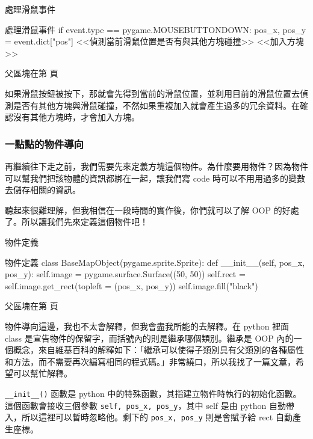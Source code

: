\documentclass[12pt, a4paper]{siweb}
\begin{document}
\begin{siweb}{處理滑鼠事件}
\begin{mylisting}{處理滑鼠事件}
if event.type == pygame.MOUSEBUTTONDOWN:
	pos_x, pos_y = event.dict["pos"]
	<<偵測當前滑鼠位置是否有與其他方塊碰撞>>
	<<加入方塊>>
\end{mylisting}
\label{處理滑鼠事件_0}\label{偵測當前滑鼠位置是否有與其他方塊碰撞_father}\label{加入方塊_father}
父區塊在第\pageref{處理滑鼠事件_father} 頁
\end{siweb}

如果滑鼠按鈕被按下，那就會先得到當前的滑鼠位置，並利用目前的滑鼠位置去偵測是否有其他方塊與滑鼠碰撞，不然如果重複加入就會產生過多的冗余資料。在確認沒有其他方塊時，才會加入方塊。

\subsubsection{一點點的物件導向}

再繼續往下走之前，我們需要先來定義方塊這個物件。為什麼要用物件？因為物件可以幫我們把該物體的資訊都綁在一起，讓我們寫 code 時可以不用用過多的變數去儲存相關的資訊。

聽起來很難理解，但我相信在一段時間的實作後，你們就可以了解 OOP 的好處了。所以讓我們先來定義這個物件吧！

\begin{siweb}{物件定義}
\begin{mylisting}{物件定義}
class BaseMapObject(pygame.sprite.Sprite):
	def __init__(self, pos_x, pos_y):
		self.image = pygame.surface.Surface((50, 50))
		self.rect = self.image.get_rect(topleft = (pos_x, pos_y))
		self.image.fill("black")
		
\end{mylisting}
\label{物件定義_0}
父區塊在第\pageref{物件定義_father} 頁
\end{siweb}

物件導向這邊，我也不太會解釋，但我會盡我所能的去解釋。在 python 裡面 class 是宣告物件的保留字，而括號內的則是繼承哪個類別。繼承是 OOP 內的一個概念，來自維基百科的解釋如下：「繼承可以使得子類別具有父類別的各種屬性和方法，而不需要再次編寫相同的程式碼。」非常繞口，所以我找了一篇\href{https://medium.com/程式愛好者/什麼是oo-物件導向與繼承-6955239576af}{文章}，希望可以幫忙解釋。

\verb|__init__()| 函數是 python 中的特殊函數，其指建立物件時執行的初始化函數。這個函數會接收三個參數 \verb|self, pos_x, pos_y|，其中 self 是由 python 自動帶入，所以這裡可以暫時忽略他。剩下的 \verb|pos_x, pos_y| 則是會賦予給 rect 自動產生座標。
\end{document}

